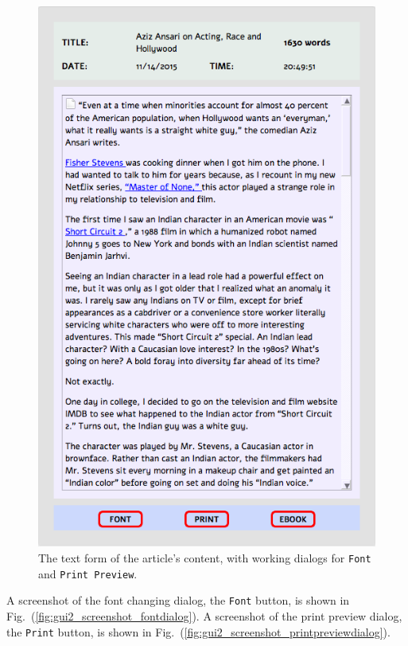 \documentclass[]{article}
\begin{document}
\begin{figure}[!ht]
\begin{minipage}[!ht]{0.45\linewidth}
   \includegraphics[width=\linewidth]{images/gui2_screenshot_articletext.png}
    \caption{The text form of the article's content, with working
      dialogs for \texttt{Font} and \texttt{Print Preview}.} \label{fig:gui2_screenshot_articletext}
  \end{minipage}
\end{figure}
A screenshot of the font changing dialog, the {\verb|Font|} button, is shown in Fig.~(\ref{fig:gui2_screenshot_fontdialog}). A screenshot of the print preview dialog, the {\verb|Print|} button, is shown in Fig.~(\ref{fig:gui2_screenshot_printpreviewdialog}).
\end{document}
